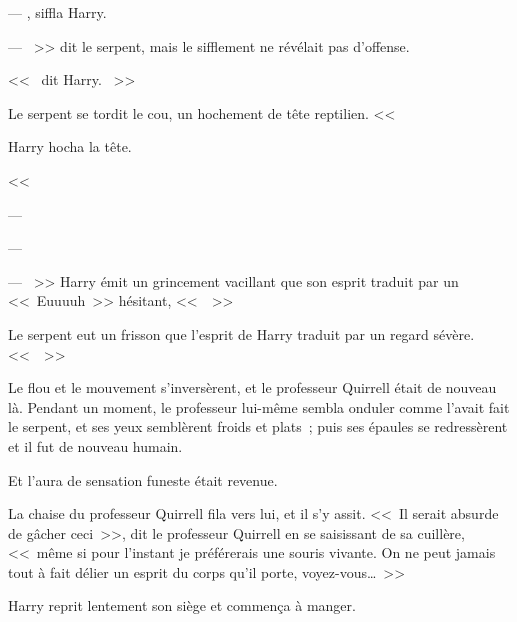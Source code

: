 --- , siffla Harry. 

--- ~>> dit le serpent, mais le sifflement ne révélait pas d'offense.

<<~ dit Harry. ~>>

Le serpent se tordit le cou, un hochement de tête reptilien. <<~

Harry hocha la tête.

<<~

--- 

--- 

--- ~>> Harry émit un grincement vacillant que son esprit traduit par un <<~Euuuuh~>> hésitant, <<~~>>

Le serpent eut un frisson que l'esprit de Harry traduit par un regard sévère. <<~~>>

Le flou et le mouvement s'inversèrent, et le professeur Quirrell était de nouveau là. Pendant un moment, le professeur lui-même sembla onduler comme l'avait fait le serpent, et ses yeux semblèrent froids et plats~; puis ses épaules se redressèrent et il fut de nouveau humain.

Et l'aura de sensation funeste était revenue.

La chaise du professeur Quirrell fila vers lui, et il s'y assit. <<~Il serait absurde de gâcher ceci~>>, dit le professeur Quirrell en se saisissant de sa cuillère, <<~même si pour l'instant je préférerais une souris vivante. On ne peut jamais tout à fait délier un esprit du corps qu'il porte, voyez-vous…~>>

Harry reprit lentement son siège et commença à manger.

\later

